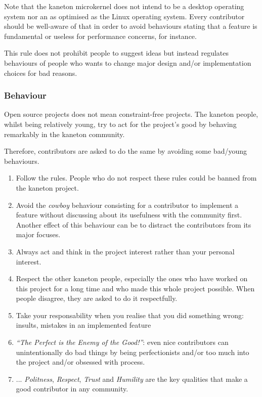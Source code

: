 Note that the kaneton microkernel does not intend to be a desktop operating
system nor an as optimised as the Linux operating system. Every contributor
should be well-aware of that in order to avoid behaviours stating that a
feature is fundamental or useless for performance concerns, for instance.

This rule does not prohibit people to suggest ideas but instead regulates
behaviours of people who wants to change major design and/or implementation
choices for bad reasons.


\subsubsection{Behaviour}

Open source projects does not mean constraint-free projects. The kaneton
people, whilst being relatively young, try to act for the project's good
by behaving remarkably in the kaneton community.

Therefore, contributors are asked to do the same by avoiding some bad/young
behaviours.

\begin{enumerate}
  \item
    Follow the rules. People who do not respect these rules could be banned
    from the kaneton project.
  \item
    Avoid the \textit{cowboy} behaviour consisting for a contributor to
    implement a feature without discussing about its usefulness with the
    community first. Another effect of this behaviour can be to distract
    the contributors from its major focuses.
  \item
    Always act and think in the project interest rather than your personal
    interest.
  \item
    Respect the other kaneton people, especially the ones who have worked
    on this project for a long time and who made this whole project possible.
    When people disagree, they are asked to do it respectfully.
  \item
    Take your responsability when you realise that you did something wrong:
    insults, mistakes in an implemented feature \etc{}
  \item
    \textit{``The Perfect is the Enemy of the Good!''}: even nice
    contributors can unintentionally do bad things by being perfectionists
    and/or too much into the project and/or obsessed with process.
  \item
    ... \textit{Politness}, \textit{Respect}, \textit{Trust} and
    \textit{Humility} are the key qualities that make a good contributor in
    any community.
\end{enumerate}

